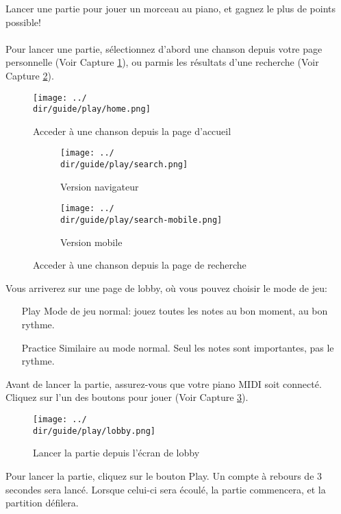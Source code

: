 Lancer une partie pour jouer un morceau au piano, et gagnez le plus de points possible!
\\\\
Pour lancer une partie, sélectionnez d’abord une chanson depuis votre page personnelle (Voir Capture \ref{fig:access-song}), ou parmis les résultats d’une recherche (Voir Capture \ref{fig:search-song}).

\begin{figure}[H]
	\texttt{[image: ../\\dir/guide/play/home.png]}
	\caption{Acceder à une chanson depuis la page d'accueil}
	\label{fig:access-song}
\end{figure}

\begin{figure}[H]
	\begin{subfigure}[b]{0.7\textwidth}
		\texttt{[image: ../\\dir/guide/play/search.png]}
		\caption{Version navigateur}
	\end{subfigure}
	\begin{subfigure}[b]{0.25\textwidth}
		\texttt{[image: ../\\dir/guide/play/search-mobile.png]}
		\caption{Version mobile}
	\end{subfigure}
	\caption{Acceder à une chanson depuis la page de recherche}
	\label{fig:search-song}
\end{figure}

Vous arriverez sur une page de lobby, où vous pouvez choisir le mode de jeu:

\begin{itemize}
	\item[Play] Mode de jeu normal: jouez toutes les notes au bon moment, au bon rythme.
	\item[Practice] Similaire au mode normal. Seul les notes sont importantes, pas le rythme.
\end{itemize}

Avant de lancer la partie, assurez-vous que votre piano MIDI soit connecté.
Cliquez sur l'un des boutons pour jouer (Voir Capture \ref{fig:choose-play-mode}).

\begin{figure}[H]
	\texttt{[image: ../\\dir/guide/play/lobby.png]}
	\caption{Lancer la partie depuis l'écran de lobby}
	\label{fig:choose-play-mode}
\end{figure}

Pour lancer la partie, cliquez sur le bouton Play. Un compte à rebours de 3 secondes sera lancé. Lorsque celui-ci sera écoulé, la partie commencera, et la partition défilera.

